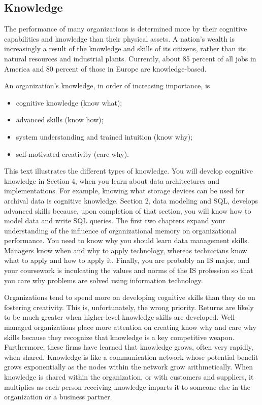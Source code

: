 \documentclass[
]{article}
\begin{document}
\hypertarget{knowledge-1}{%
\subsection*{Knowledge}\label{knowledge-1}}

The performance of many organizations is determined more by their
cognitive capabilities and knowledge than their physical assets. A
nation's wealth is increasingly a result of the knowledge and skills of
its citizens, rather than its natural resources and industrial plants.
Currently, about 85 percent of all jobs in America and 80 percent of
those in Europe are knowledge-based.

An organization's knowledge, in order of increasing importance, is

\begin{itemize}
\item
  cognitive knowledge (know what);
\item
  advanced skills (know how);
\item
  system understanding and trained intuition (know why);
\item
  self-motivated creativity (care why).
\end{itemize}

This text illustrates the different types of knowledge. You will develop
cognitive knowledge in Section 4, when you learn about data
architectures and implementations. For example, knowing what storage
devices can be used for archival data is cognitive knowledge. Section 2,
data modeling and SQL, develops advanced skills because, upon completion
of that section, you will know how to model data and write SQL queries.
The first two chapters expand your understanding of the influence of
organizational memory on organizational performance. You need to know
why you should learn data management skills. Managers know when and why
to apply technology, whereas technicians know what to apply and how to
apply it. Finally, you are probably an IS major, and your coursework is
inculcating the values and norms of the IS profession so that you care
why problems are solved using information technology.

Organizations tend to spend more on developing cognitive skills than
they do on fostering creativity. This is, unfortunately, the wrong
priority. Returns are likely to be much greater when higher-level
knowledge skills are developed. Well-managed organizations place more
attention on creating know why and care why skills because they
recognize that knowledge is a key competitive weapon. Furthermore, these
firms have learned that knowledge grows, often very rapidly, when
shared. Knowledge is like a communication network whose potential
benefit grows exponentially as the nodes within the network grow
arithmetically. When knowledge is shared within the organization, or
with customers and suppliers, it multiplies as each person receiving
knowledge imparts it to someone else in the organization or a business
partner.
\end{document}
